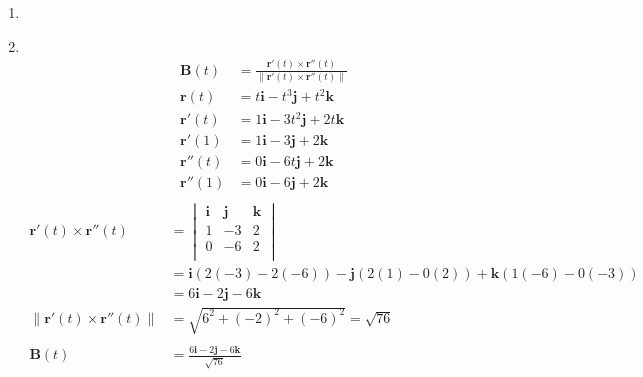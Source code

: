 \documentclass[11pt]{article}
\newcommand\Item[1][]{%
  \ifx\relax#1\relax  \item \else \item[#1] \fi
  \abovedisplayskip=0pt\abovedisplayshortskip=0pt~\vspace*{-\baselineskip}}
\begin{document}
\begin{enumerate}
\begin{enumerate}
              \Item
              \begin{align*}
                  \textbf{B}(t)   & = \frac{\textbf{r}'(t)\times\textbf{r}''(t)}{\| \textbf{r}'(t)\times\textbf{r}''(t) \|} \\
                  \textbf{r}(t)   & = t\textbf{i} - t^3\textbf{j} + t^2\textbf{k}                                           \\
                  \textbf{r}'(t)  & = 1\textbf{i} - 3t^2\textbf{j} + 2t\textbf{k}                                           \\
                  \textbf{r}'(1)  & =  1\textbf{i} - 3\textbf{j} + 2\textbf{k}                                              \\
                  \textbf{r}''(t) & = 0\textbf{i} - 6t\textbf{j} + 2\textbf{k}                                              \\
                  \textbf{r}''(1) & = 0\textbf{i} - 6\textbf{j} + 2\textbf{k}                                               \\
              \end{align*}
              \begin{align*}
                  \textbf{r}'(t)\times\textbf{r}''(t)       & =
                  \begin{vmatrix}
                      \textbf{i} & \textbf{j} & \textbf{k} \\
                      1          & -3         & 2          \\
                      0          & -6         & 2          \\
                  \end{vmatrix}                                                                                              \\
                                                            & = \textbf{i}(2(-3)-2(-6)) - \textbf{j}(2(1)-0(2)) + \textbf{k}(1(-6)-0(-3)) \\
                                                            & = 6\textbf{i} - 2\textbf{j} - 6\textbf{k}                                   \\
                  \| \textbf{r}'(t)\times\textbf{r}''(t) \| & = \sqrt{6^2 + (-2)^2 + (-6)^2} = \sqrt{76}                                  \\\\
                  \textbf{B}(t)                             & = \frac{6\textbf{i} - 2\textbf{j} - 6\textbf{k}}{\sqrt{76}}                 \\
              \end{align*}


\end{enumerate}
\end{enumerate}
\end{document}
